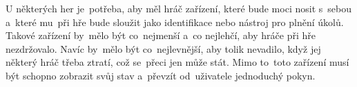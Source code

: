 U některých her je~potřeba, aby měl hráč zařízení, které bude moci nosit s~sebou a~které mu~při hře bude sloužit jako identifikace nebo nástroj pro plnění úkolů.
Takové zařízení by~mělo být co~nejmenší a~co nejlehčí, aby hráče při hře nezdržovalo.
Navíc by~mělo být co~nejlevnější, aby tolik nevadilo, když jej některý hráč třeba ztratí, což se~přeci jen může stát.
Mimo to~toto zařízení musí být schopno zobrazit svůj stav a~převzít od~uživatele jednoduchý pokyn.




